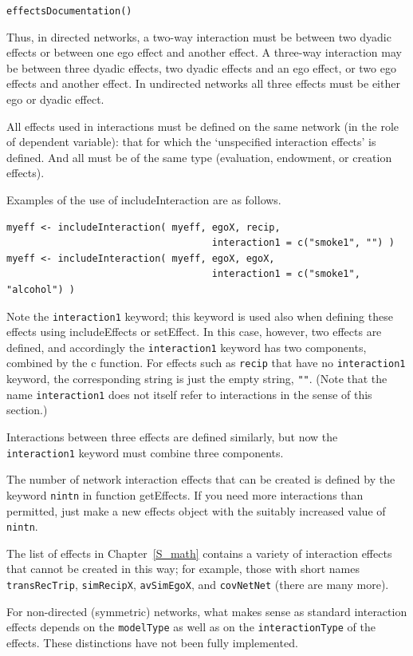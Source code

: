 \documentclass[a4paper,fleqn,11pt]{article}
\newcommand{\+}{\, + \,}
\newcommand{\sfn}[1]{\textsf{#1}}
\begin{document}
\verb|effectsDocumentation()|
\bigskip

Thus, in directed networks, a two-way interaction must be between two dyadic
effects or between one ego effect and another effect. A three-way interaction
may be between three dyadic effects, two dyadic effects and an ego effect, or
two ego effects and another effect. In undirected networks all three effects
must be either ego or dyadic effect.

All effects used in interactions must be defined on the same network
(in the role of dependent variable): that for
which the `unspecified
interaction effects' is defined.  And all must be
of the same type (evaluation, endowment, or creation effects).

Examples of the use of \sfn{includeInteraction} are as follows.
\begin{verbatim}
myeff <- includeInteraction( myeff, egoX, recip,
                                    interaction1 = c("smoke1", "") )
myeff <- includeInteraction( myeff, egoX, egoX,
                                    interaction1 = c("smoke1", "alcohol") )
\end{verbatim}
Note the \texttt{interaction1} keyword; this keyword is used also
when defining these effects using \sfn{includeEffects} or
\textsf{setEffect}. In this case, however, two effects are defined,
and accordingly the \texttt{interaction1} keyword has two components,
combined by the \sfn{c} function.
For effects such as \texttt{recip} that have no \texttt{interaction1}
keyword, the corresponding string is just the empty string, \texttt{""}.
(Note that the name \texttt{interaction1} does not itself refer to interactions
in the sense of this section.)

Interactions between three effects are defined similarly,
but now the \texttt{interaction1} keyword must combine three components.

The number of network interaction effects that can be created is defined by the
keyword \texttt{nintn} in function \sfn{getEffects}. If you need more
interactions than permitted, just make a new effects object with the
suitably increased value of \texttt{nintn}.

The list of effects in Chapter~\ref{S_math} contains a variety of
interaction effects that cannot be created in this way;
for example, those with short names
\texttt{transRecTrip}, \texttt{simRecipX},  \texttt{avSimEgoX},
and \texttt{covNetNet} (there are many more).
\medskip

For non-directed (symmetric) networks, what makes sense as standard interaction
effects depends on the \texttt{modelType} as well as on the
 \texttt{interactionType} of the effects. These distinctions have not been fully
implemented.
\end{document}
